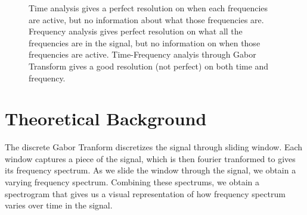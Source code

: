 \documentclass{article}
\begin{document}
\begin{figure}[!b]
\centering
{}
\quad \quad 
{}
\quad \quad 
{}
\caption{Time analysis gives a perfect resolution on when each frequencies are active, but no information about what those frequencies are. Frequency analysis gives perfect resolution on what all the frequencies are in the signal, but no information on when those frequencies are active. Time-Frequency analyis through Gabor Transform gives a good resolution (not perfect) on both time and frequency.}
\label{fig:resolution}
\end{figure}

\pagebreak
\section{Theoretical Background}\label{Introduction}
The discrete Gabor Tranform discretizes the signal through sliding window. Each window captures a piece of the signal, which is then fourier tranformed to gives its frequency spectrum. As we slide the window through the signal, we obtain a varying frequency spectrum. Combining these spectrums, we obtain a spectrogram that gives us a visual representation of how frequency spectrum varies over time in the signal.
\end{document}
